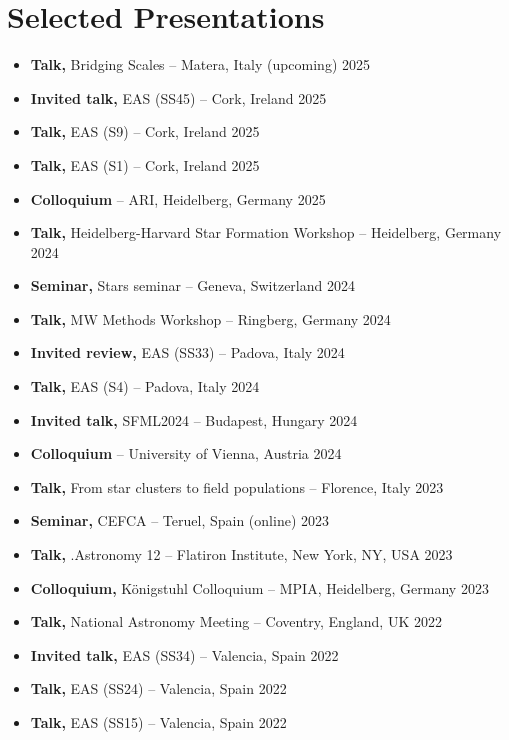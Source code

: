 \section*{Selected Presentations}

\begin{itemize}
    \item \textbf{Talk,} Bridging Scales -- Matera, Italy \hfill (upcoming) 2025
    \item \textbf{Invited talk,} EAS (SS45) -- Cork, Ireland \hfill 2025
    \item \textbf{Talk,} EAS (S9) -- Cork, Ireland \hfill 2025
    \item \textbf{Talk,} EAS (S1) -- Cork, Ireland \hfill 2025
    \item \textbf{Colloquium} -- ARI, Heidelberg, Germany \hfill 2025
    \item \textbf{Talk,} Heidelberg-Harvard Star Formation Workshop -- Heidelberg, Germany \hfill 2024
    \item \textbf{Seminar,} Stars seminar -- Geneva, Switzerland \hfill 2024
    \item \textbf{Talk,} MW Methods Workshop -- Ringberg, Germany \hfill 2024
    \item \textbf{Invited review,} EAS (SS33) -- Padova, Italy \hfill 2024
    \item \textbf{Talk,} EAS (S4) -- Padova, Italy \hfill 2024
    \item \textbf{Invited talk,} SFML2024 -- Budapest, Hungary \hfill 2024
    \item \textbf{Colloquium}  -- University of Vienna, Austria \hfill 2024
    \item \textbf{Talk,} From star clusters to field populations -- Florence, Italy \hfill 2023
    \item \textbf{Seminar,} CEFCA -- Teruel, Spain (online) \hfill 2023
    \item \textbf{Talk,} .Astronomy 12 -- Flatiron Institute, New York, NY, USA \hfill 2023
    \item \textbf{Colloquium,} Königstuhl Colloquium -- MPIA, Heidelberg, Germany \hfill 2023
    \item \textbf{Talk,} National Astronomy Meeting -- Coventry, England, UK \hfill 2022
    \item \textbf{Invited talk,} EAS (SS34) -- Valencia, Spain \hfill 2022
    \item \textbf{Talk,} EAS (SS24) -- Valencia, Spain \hfill 2022
    \item \textbf{Talk,} EAS (SS15) -- Valencia, Spain \hfill 2022

\end{itemize}
